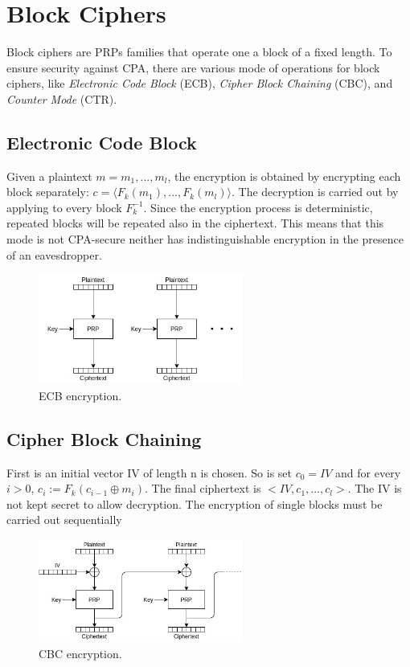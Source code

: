 \section{Block Ciphers}
\par
Block ciphers are PRPs families that operate one a block of a fixed length. To ensure security against CPA, there are various mode of operations for block ciphers, like \emph{Electronic Code Block} (ECB), \emph{Cipher Block Chaining} (CBC), and \emph{Counter Mode} (CTR).

\subsection{Electronic Code Block}
\par
Given a plaintext $m = m_1,...,m_l$, the encryption is obtained by encrypting each block separately: $c = \langle F_k(m_1),...,F_k(m_l) \rangle$.
The decryption is carried out by applying to every block $F_k^{-1}$. Since the encryption process is deterministic, repeated blocks will be repeated also in the ciphertext. This means that this mode is not CPA-secure neither has indistinguishable encryption in the presence of an eavesdropper.
\begin{figure}[H]
    \centering
    \includegraphics[width=0.6\textwidth]{img/private-key/ecb.jpg}
    \caption{ECB encryption.}
\end{figure}

\subsection{Cipher Block Chaining}
\par
First is an initial vector IV of length n is chosen. So is set $c_0 = IV$ and for every $i > 0$, $c_i := F_k(c_{i-1} \oplus m_i)$. The final ciphertext is $<IV,c_1,...,c_l>$. The IV is not kept secret to allow decryption. The encryption of single blocks must be carried out sequentially
\begin{figure}[H]
    \centering
    \includegraphics[width=0.6\textwidth]{img/private-key/cbc.jpg}
    \caption{CBC encryption.}
\end{figure}

